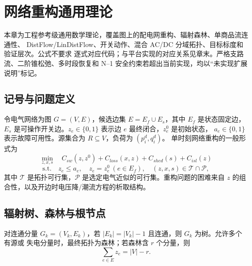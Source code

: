 
\section{网络重构通用理论}\label{sec:nr-theory}

\begin{theorynote}
本章为工程参考级通用数学理论，覆盖图上的配电网重构、辐射森林、单商品流连通性、
DistFlow/LinDistFlow、开关动作、混合 AC/DC 分域拓扑、目标标度和验证层次。公式不要求
逐式对应代码；与平台实现的对应关系见章末。严格支路流、二阶锥松弛、多时段恢复和
N--1 安全约束若超出当前实现，均以“未实现扩展说明”标记。
\end{theorynote}

\subsection{记号与问题定义}

令电气网络为图 $G=(V,E)$，候选边集 $E=E_f\cup E_s$，其中 $E_f$ 是状态固定边，
$E_s$ 是可操作开关边。$z_e\in\{0,1\}$ 表示边 $e$ 最终闭合，$z_e^0$ 是初始状态，
$a_e\in\{0,1\}$ 表示故障可用性。源集合为 $R\subseteq V$，负荷为 $(p_i^d,q_i^d)$。
单时刻网络重构的一般形式为
\begin{equation}
\min_{z,x,s}\quad C_{sw}(z,z^0)+C_{loss}(x,z)+C_{shed}(s)+C_{isl}(z)
\end{equation}
\begin{equation}
\text{s.t.}\quad z_e\le a_e,\quad
z_e=z_e^0\ (e\in E_f),\quad
(z,x,s)\in\mathcal T\cap\mathcal P,
\end{equation}
其中 $\mathcal T$ 是拓扑可行集，$\mathcal P$ 是选定电气近似的可行集。重构问题的困难来自
$z$ 的组合性，以及开边时电压降/潮流方程的析取结构。

\subsection{辐射树、森林与根节点}

\begin{definition}[辐射供电拓扑]
对连通分量 $G_k=(V_k,E_k)$，若 $|E_k|=|V_k|-1$ 且连通，则 $G_k$ 为树。允许多个有源或
失电分量时，最终拓扑为森林；若森林含 $r$ 个分量，则
\begin{equation}
\sum_{e\in E}z_e=|V|-r.
\end{equation}
\end{definition}

